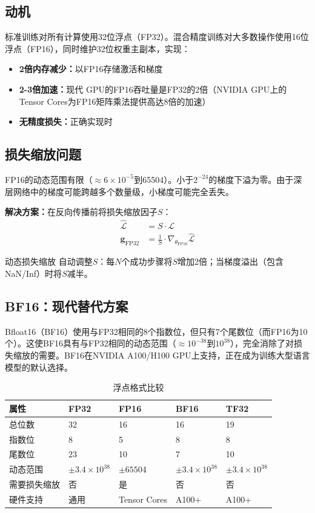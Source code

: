 \subsection{动机}

标准训练对所有计算使用32位浮点（FP32）。混合精度训练对大多数操作使用16位浮点（FP16），同时维护32位权重主副本，实现：
\begin{itemize}
    \item \textbf{2倍内存减少：}以FP16存储激活和梯度
    \item \textbf{2-3倍加速：}现代 GPU的FP16吞吐量是FP32的2倍（NVIDIA GPU上的Tensor Cores为FP16矩阵乘法提供高达8倍的加速）
    \item \textbf{无精度损失：}正确实现时
\end{itemize}

\subsection{损失缩放问题}

FP16的动态范围有限（$\approx 6 \times 10^{-5}$到65504）。小于$2^{-24}$的梯度下溢为零。由于深层网络中的梯度可能跨越多个数量级，小梯度可能完全丢失。

\textbf{解决方案：}在反向传播前将损失缩放因子$S$：
\begin{align}
\hat{\mathcal{L}} &= S \cdot \mathcal{L} \\
\mathbf{g}_{\text{FP32}} &= \frac{1}{S} \cdot \nabla_{\theta_{\text{FP16}}} \hat{\mathcal{L}}
\end{align}

动态损失缩放 \cite{micikevicius2018mixed}自动调整$S$：每$N$个成功步骤将$S$增加2倍；当梯度溢出（包含NaN/Inf）时将$S$减半。

\subsection{BF16：现代替代方案}

Bfloat16（BF16）使用与FP32相同的8个指数位，但只有7个尾数位（而FP16为10个）。这使BF16具有与FP32相同的动态范围（$\approx 10^{-38}$到$10^{38}$），完全消除了对损失缩放的需要。BF16在NVIDIA A100/H100 GPU上支持，正在成为训练大型语言模型的默认选择。

\begin{table}[ht]
    \centering
    \caption{浮点格式比较}
    \begin{tabular}{L{2.5cm} M{1.5cm} M{1.5cm} M{1.5cm} M{3cm}}
        \toprule
        \textbf{属性} & \textbf{FP32} & \textbf{FP16} & \textbf{BF16} & \textbf{TF32} \\
        \midrule
        总位数 & 32 & 16 & 16 & 19 \\
        指数位 & 8 & 5 & 8 & 8 \\
        尾数位 & 23 & 10 & 7 & 10 \\
        动态范围 & $\pm 3.4 \times 10^{38}$ & $\pm 65504$ & $\pm 3.4 \times 10^{38}$ & $\pm 3.4 \times 10^{38}$ \\
        需要损失缩放 & 否 & 是 & 否 & 否 \\
        硬件支持 & 通用 & Tensor Cores & A100+ & A100+ \\
        \bottomrule
    \end{tabular}
\end{table}


